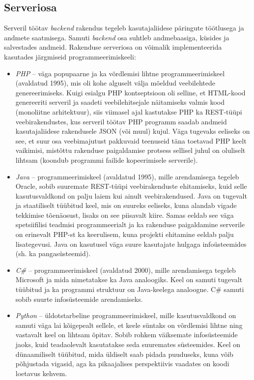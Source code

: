 \subsection{Serveriosa}
Serveril töötav \textit{backend} rakendus tegeleb kasutajaliidese päringute töötlusega ja andmete saatmisega.
Samuti \textit{backend} osa suhtleb andmebaasiga, küsides ja salvestades andmeid. Rakenduse serveriosa on võimalik
implementeerida kasutades järgmiseid programmeerimiskeeli:
\begin{itemize}
    \item \textit{PHP} -- väga popupaarne ja ka võrdlemisi lihtne programmeerimiskeel (avaldatud 1995), mis oli kohe alguselt välja mõeldud veebilehtede
genereerimiseks. Kuigi esialgu PHP kontseptsioon oli selline, et HTML-kood genereeriti serveril ja saadeti veebilehitsejale 
näitamiseks valmis kood (monoliitne arhitektuur), siis viimasel ajal kastutakse PHP ka REST-tüüpi veebirakendustes, kus serveril
töötav PHP programm saadab andmeid kasutajaliidese rakendusele JSON (või muul) kujul. Väga tugevaks eeliseks on see, et suur osa 
veebimajutust pakkuvaid teenuseid täna toetavad PHP keelt vaikimisi, mistõttu rakenduse paigaldamise protsess sellisel juhul on oluliselt lihtsam 
(koondub programmi failide kopeerimisele serverile). 
    \item \textit{Java} -- programmeerimiskeel (avaldatud 1995), mille arendamisega tegeleb Oracle, sobib suuremate REST-tüüpi veebirakenduste ehitamiseks,
kuid selle kasutusvaldkond on palju laiem kui ainult veebirakendused. Java on tugevalt ja staatiliselt tüübitud keel, 
mis on suureks eeliseks, kuna alandab vigade tekkimise tõenäosust, lisaks on see piisavalt kiire.  Samas eeldab see väga spetsiifilisi teadmisi programmeerialt ja ka rakenduse paigaldamine serverile on 
erinevalt PHP-st ka keerulisem, kuna projekti ehitamine eeldab palju lisategevusi. Java on kasutusel väga suure kasutajate hulgaga
infoüsteemides (sh. ka pangasüsteemid).
    \item \textit{C\#} -- programmeerimiskeel (avaldatud 2000), mille arendamisega tegeleb Microsoft ja mida nimetatakse ka Java analoogiks.
Keel on samuti tugevalt tüübitud ja ka programmi struktuur on Java-keelega analoogne. C\# samuti sobib suurte infosüsteemide
arendamiseks.
    \item \textit{Python} --  üldotstarbeline programmeerimiskeel, mille kasutusvaldkond on samuti väga lai kõigepealt sellele, et
keele süntaks on võrdlemisi lihtne ning vastavalt keel on lihtsam õpitav. Sobib rohkem väiksemate infosüsteemide jaoks, kuid teadaolevalt 
kasutatakse seda suuremates süsteemides. Keel on dünaamiliselt tüübitud, mida üldiselt saab pidada puuduseks, kuna võib põhjustada vigasid, aga ka 
pikaajalises perspektiivis vaadates on koodi loetavus kehvem.  
\end{itemize}

